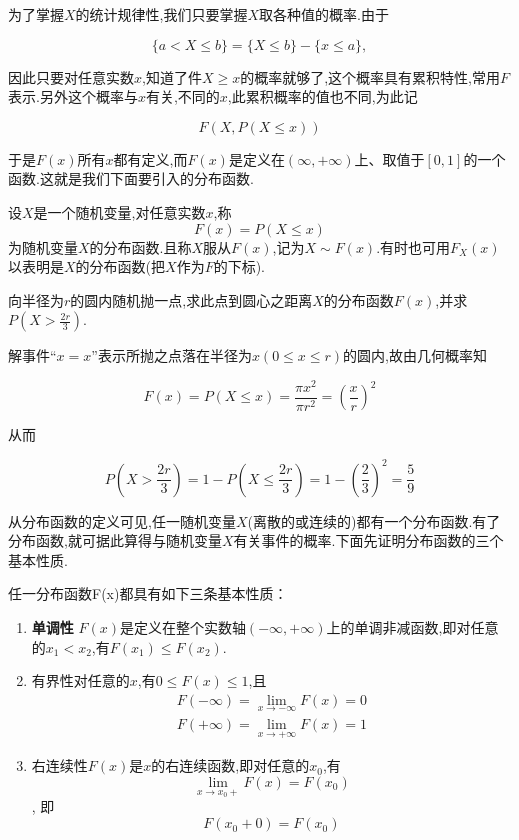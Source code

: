 为了掌握$ X $的统计规律性,我们只要掌握$ X $取各种值的概率.由于

\[
\{a < X \leq b \} = \{ X \leq b\} - \{x\leq a\},
\]

因此只要对任意实数$ x $,知道了件$ X\geq x $的概率就够了,这个概率具有累积特性,常用$ F $表示.另外这个概率与$ x $有关,不同的$ x $,此累积概率的值也不同,为此记

\[
F(X,P(X\leq x))
\]

于是$ F(x) $所有$ x $都有定义,而$ F(x) $是定义在$ (\infty,+\infty ) $上、取值于$ [0,1] $的一个函数.这就是我们下面要引入的分布函数.

\begin{definition}{}{}
	设$ X $是一个随机变量,对任意实数$ x $,称
	\begin{equation} 
	F(x)=P(X \leqslant x) \label{2.1.1}
	\end{equation}
	为随机变量$ X $的分布函数.且称$ X $服从$ F(x) $,记为$ X\sim F(x) $.有时也可用$F_{X}(x)$以表明是$ X $的分布函数(把$ X $作为$ F $的下标).
\end{definition}

\begin{example}
	向半径为$ r $的圆内随机抛一点,求此点到圆心之距离$ X $的分布函数$ F(x) $,并求$P\left(X>\frac{2 r}{3}\right)$.
	
	解事件“$ x=x $”表示所抛之点落在半径为$x(0 \leqslant x \leqslant r)$的圆内,故由几何概率知
	
	\[ 
	F(x)=P(X \leqslant x)=\frac{\pi x^{2}}{\pi r^{2}}=\left(\frac{x}{r}\right)^{2}
	\]
	
	从而
	
	\[ 
	P\left(X>\frac{2 r}{3}\right)=1-P\left(X \leqslant \frac{2 r}{3}\right)=1-\left(\frac{2}{3}\right)^{2}=\frac{5}{9}
	\]
	
	
\end{example}


从分布函数的定义可见,任一随机变量$ X $(离散的或连续的)都有一个分布函数.有了分布函数,就可据此算得与随机变量$ X $有关事件的概率.下面先证明分布函数的三个基本性质.

\begin{theorem}{}{}
	任一分布函数F(x)都具有如下三条基本性质：
	\begin{enumerate}
		\item \textbf{单调性} $ F(x) $是定义在整个实数轴$ (-\infty,+\infty ) $上的单调非减函数,即对任意的$ x_1<x_2 $,有$ F(x_1)\leq F(x_2) $.
		\item 有界性对任意的$ x $,有$ 0\leq F(x)\leq 1 $,且
		\[ 
		\begin{array}{l}{F(-\infty)=\lim _{x \rightarrow-\infty} F(x)=0} \\ {F(+\infty)=\lim _{x \rightarrow+\infty} F(x)=1}\end{array}
		\]
		
		\item 右连续性$ F(x) $是$ x $的右连续函数,即对任意的$ x_0 $,有
		\[ 
		\lim _{x \rightarrow x_{0}+} F(x)=F\left(x_{0}\right)
		\],
		即
		\[ 
		F\left(x_{0}+0\right)=F\left(x_{0}\right)
		\]
	\end{enumerate}
\end{theorem}

